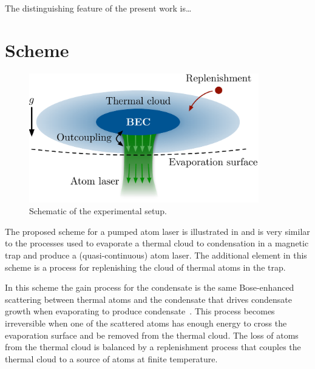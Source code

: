 The distinguishing feature of the present work is\dots

\section{Scheme}
\label{KineticTheory:Scheme}

\begin{figure}
    \centering
        \includegraphics[width=10cm]{QKTScheme}
    \caption{Schematic of the experimental setup.}
    \label{KineticTheory:QKTScheme}
\end{figure}

The proposed scheme for a pumped atom laser is illustrated in  and is very similar to the processes used to evaporate a thermal cloud to condensation in a magnetic trap and produce a (quasi-continuous) atom laser. The additional element in this scheme is a process for replenishing the cloud of thermal atoms in the trap.  

In this scheme the gain process for the condensate is the same Bose-enhanced scattering between thermal atoms and the condensate that drives condensate growth when evaporating to produce condensate~\citep{Gardiner:1997kx,Davis:2000vn,Bijlsma:2000}.  This process becomes irreversible when one of the scattered atoms has enough energy to cross the evaporation surface and be removed from the thermal cloud.  The loss of atoms from the thermal cloud is balanced by a replenishment process that couples the thermal cloud to a source of atoms at finite temperature.

